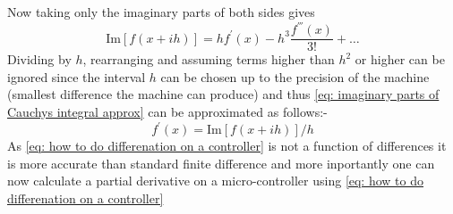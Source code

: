 Now taking only the imaginary parts of both sides gives
\begin{equation}
\mathrm{Im}[f(x+ih)] = hf^{'}(x) - h^3\frac{f^{'''}(x)}{3!}+\dots \label{eq: imaginary parts of  Cauchys integral approx}
\end{equation}
Dividing by $h$, rearranging and assuming terms higher than $h^2$ or higher can be ignored since the interval $h$ can be chosen up to the precision of the machine (smallest difference the machine can produce) and thus \eqref{eq: imaginary parts of  Cauchys integral approx} can be approximated as follows:-
\begin{equation}
f^{'}(x) = \mathrm{Im}[f(x+ih)]/h \label{eq: how to do differenation on a controller}
\end{equation}
As \eqref{eq: how to do differenation on a controller} is not a function of differences it is more accurate than standard finite difference and more inportantly one can now calculate a  partial derivative on a micro-controller using \eqref{eq: how to do differenation on a controller} 


